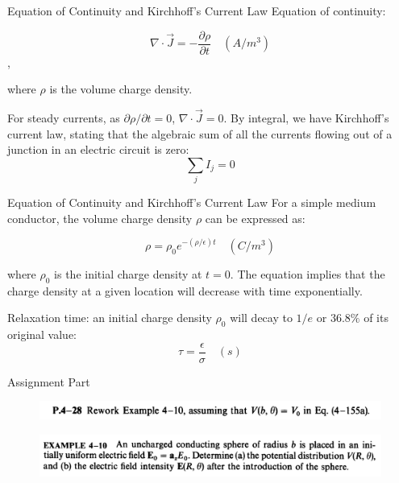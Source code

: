 \documentclass[xcolor={dvipsnames}]{beamer}
\begin{document}
\begin{frame}{Equation of Continuity and Kirchhoff's Current Law}
Equation of continuity:

$$
\nabla\cdot\vec{J} = -\frac{\partial \rho}{\partial t} \quad (A/m^3)
$$,

where $\rho$ is the volume charge density. 

For steady currents, as $\partial \rho/\partial t= 0$, $\nabla\cdot \vec{J}=0$. By integral, we have Kirchhoff's current law, stating that the algebraic sum of all the currents flowing out of a junction in an electric circuit is zero: 
$$
\sum_j I_j = 0
$$

\end{frame}
\begin{frame}{Equation of Continuity and Kirchhoff's Current Law}
For a simple medium conductor, the volume charge density $\rho$ can be expressed as:

$$
\rho = \rho_0 e^{-(\rho/\epsilon)t}\quad (C/m^3)
$$

where $\rho_0$ is the initial charge density at $t=0$. The equation implies that the charge density at a given location will decrease with time exponentially. 


Relaxation time: an initial charge density $\rho_0$ will decay to $1/e$ or $36.8\%$ of its original value:
$$
\tau = \frac{\epsilon}{\sigma}\quad(s)
$$
\end{frame}
\begin{frame}{Assignment Part}
\begin{figure}[H]
	\centering
	\includegraphics[width=0.9\linewidth]{5_0.png}
\end{figure}
\begin{figure}[H]
	\centering
	\includegraphics[width=0.9\linewidth]{5_1.png}
\end{figure}
\end{frame}
\end{document}
